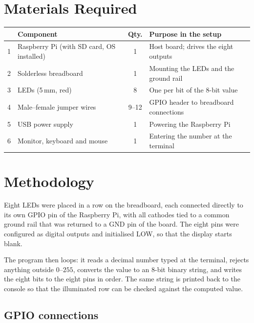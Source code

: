 \documentclass[10pt,a4paper]{article}
\begin{document}
\section{Materials Required}

\noindent
\begin{tabularx}{\textwidth}{@{}p{0.4cm} >{\raggedright\arraybackslash}p{5.2cm} c X@{}}
\toprule
\rowcolor{soft}
\multicolumn{1}{@{}l}{\textbf{\#}} & \textbf{Component} & \textbf{Qty.} & \textbf{Purpose in the setup} \\
\midrule
1 & Raspberry Pi (with SD card, OS installed) & 1 & Host board; drives the eight outputs \\
2 & Solderless breadboard                     & 1 & Mounting the LEDs and the ground rail \\
3 & LEDs (5\,mm, red)                         & 8 & One per bit of the 8-bit value \\
4 & Male--female jumper wires                 & 9--12 & GPIO header to breadboard connections \\
5 & USB power supply                          & 1 & Powering the Raspberry Pi \\
6 & Monitor, keyboard and mouse               & 1 & Entering the number at the terminal \\
\bottomrule
\end{tabularx}

\section{Methodology}

Eight LEDs were placed in a row on the breadboard, each connected directly to its own
GPIO pin of the Raspberry Pi, with all cathodes tied to a common ground rail that was
returned to a GND pin of the board. The eight pins were configured as digital outputs
and initialised LOW, so that the display starts blank.

The program then loops: it reads a decimal number typed at the terminal, rejects
anything outside $0$--$255$, converts the value to an 8-bit binary string, and writes
the eight bits to the eight pins in order. The same string is printed back to the
console so that the illuminated row can be checked against the computed value.

\subsection{GPIO connections}
\end{document}
